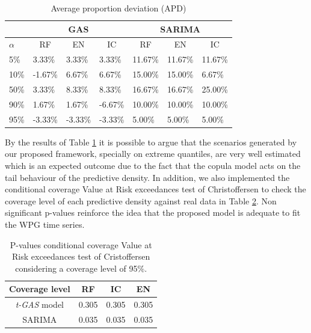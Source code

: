 \documentclass[a4paper]{IEEEtran}
\begin{document}
\begin{table}[htbp]
\centering
\caption{Average proportion deviation (APD)}
\label{APD}
\begin{tabular}{@{}l|lll|lll@{}}
& \multicolumn{3}{c}{GAS}                                                  & \multicolumn{3}{c}{SARIMA}                                               \\  \hline
$\alpha$ & \multicolumn{1}{c}{RF} & \multicolumn{1}{c}{EN} & \multicolumn{1}{c}{IC} & \multicolumn{1}{c}{RF} & \multicolumn{1}{c}{EN} & \multicolumn{1}{c}{IC} \\ \hline
5\%   &     3.33\%            &  3.33\%               &   3.33\%                & 11.67\%                &  11.67\%               &  11.67\% \\
10\%  &     -1.67\%            &  6.67\%               &   6.67\%               & 15.00\%                &  15.00\%               &  6.67\%  \\
50\%  &     3.33\%            &  8.33\%               &  8.33\%                 & 16.67\%                 &  16.67\%                &  25.00\%  \\
90\%  &     1.67\%            &   1.67\%               &  -6.67\%               & 10.00\%                 &  10.00\%               &  10.00\% \\
95\%  &     -3.33\%           &  -3.33\%               &  -3.33\%               & 5.00\%                 &  5.00\%                &  5.00\%  \\ \hline
\end{tabular}
\end{table}
By the results of Table \ref{APD} it is possible to argue that the scenarios generated by our proposed framework, specially on extreme quantiles, are very well estimated which is an expected outcome due to the fact that the copula model acts on the tail behaviour of the predictive density. In addition, we also implemented the conditional coverage Value at Risk exceedances test of Christoffersen \cite{christoffersen1998evaluating} to check the coverage level of each predictive density against real data in Table \ref{cristofersen}. Non significant p-values reinforce the idea that the proposed model is adequate to fit the WPG time series. 
\begin{table}[htbp]
\centering
\caption{P-values conditional coverage Value at Risk exceedances test of Cristoffersen considering a coverage level of 95\%.}
\begin{tabular}{c|ccc}
\hline
{\bf Coverage level}      & {\bf RF} & {\bf IC} & {\bf EN} \\ \hline
\emph{t-GAS} model   & 0.305             & 0.305           & 0.305        \\
SARIMA               & 0.035             & 0.035           & 0.035   \\ \hline     
\end{tabular}
\label{cristofersen}
\end{table}
\end{document}
